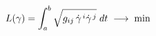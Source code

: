 \documentclass[preview]{standalone}
\begin{document}
\begin{align*}
\special{dvisvgm:raw <g id='unique000'>}L(\gamma) = \int_a^b \sqrt{g_{ij}\,\dot{\gamma}^{\,i}\dot{\gamma}^{\,j}}\;dt \;\longrightarrow\; \min\special{dvisvgm:raw </g>}
\end{align*}
\end{document}
